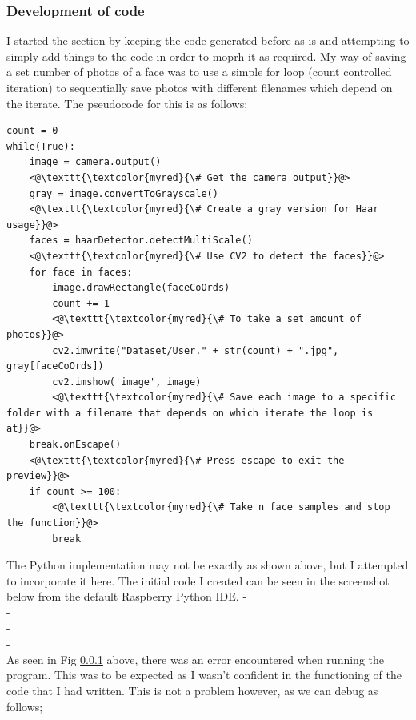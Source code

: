 \documentclass[9pt]{article}
\begin{document}
\subsubsection{Development of code}
I started the section by keeping the code generated before as is and attempting to simply add things to the code in order to moprh it as required. My way of saving a set number of photos of a face was to use a simple for loop (count controlled iteration) to sequentially save photos with different filenames which depend on the iterate. The pseudocode for this is as follows;
\begin{lstlisting}
count = 0
while(True):
	image = camera.output()
	<@\texttt{\textcolor{myred}{\# Get the camera output}}@> 
	gray = image.convertToGrayscale()
	<@\texttt{\textcolor{myred}{\# Create a gray version for Haar usage}}@> 
	faces = haarDetector.detectMultiScale()
	<@\texttt{\textcolor{myred}{\# Use CV2 to detect the faces}}@> 
	for face in faces:
		image.drawRectangle(faceCoOrds) 
		count += 1
		<@\texttt{\textcolor{myred}{\# To take a set amount of photos}}@> 
		cv2.imwrite("Dataset/User." + str(count) + ".jpg", gray[faceCoOrds])
		cv2.imshow('image', image)
		<@\texttt{\textcolor{myred}{\# Save each image to a specific folder with a filename that depends on which iterate the loop is at}}@> 
	break.onEscape() 
	<@\texttt{\textcolor{myred}{\# Press escape to exit the preview}}@> 
	if count >= 100: 
		<@\texttt{\textcolor{myred}{\# Take n face samples and stop the function}}@> 
		break
\end{lstlisting}
The Python implementation may not be exactly as shown above, but I attempted to incorporate it here. The initial code I created can be seen in the screenshot below from the default Raspberry Python IDE.
-\\
-\\
-\\
-\\
As seen in Fig \ref{} above, there was an error encountered when running the program. This was to be expected as I wasn't confident in the functioning of the code that I had written. This is not a problem however, as we can debug as follows;
\end{document}
